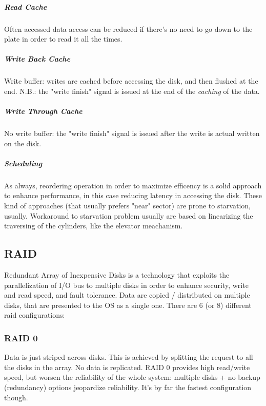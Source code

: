 \documentclass{article}
\begin{document}
						\subparagraph{Read Cache}
							Often accessed data access can be reduced if there's no need to go down to the plate in order to read it all the times.
						
						\subparagraph{Write Back Cache}
							Write buffer: writes are cached before accessing the disk, and then flushed at the end. N.B.: the "write finish" signal is issued at the end of the \emph{caching} of the data.
							
						\subparagraph{Write Through Cache}
							No write buffer: the "write finish" signal is issued after the write is actual written on the disk.
							
						\subparagraph{Scheduling}
							As always, reordering operation in order to maximize efficency is a solid approach to enhance performance, in this case reducing latency in accessing the disk. These kind of approaches (that usually prefers "near" sector) are prone to starvation, usually. Workaround to starvation problem usually are based on linearizing the traversing of the cylinders, like the elevator meachanism.\\
			
			\subsection{RAID}
				Redundant Array of Inexpensive Disks is a technology that exploits the parallelization of I/O bus to multiple disks in order to enhance security, write and read speed, and fault tolerance. Data are copied / distributed on multiple disks, that are presented to the OS as a single one. There are 6 (or 8) different raid configurations:
				
				\subsubsection{RAID 0}
					Data is just striped across disks. This is achieved by splitting the request to all the disks in the array. No data is replicated. RAID 0 provides high read/write speed, but worsen the reliability of the whole system: multiple disks + no backup (redundancy) options jeopardize reliability. It's by far the fastest configuration though.
					
\end{document}
